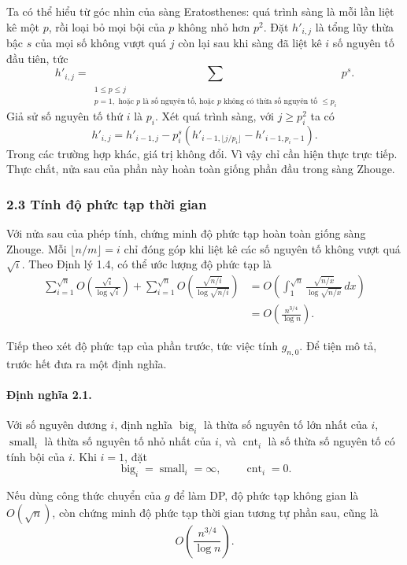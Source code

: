 \documentclass[11pt]{article}
\begin{document}
Ta có thể hiểu từ góc nhìn của sàng Eratosthenes: quá trình sàng là mỗi lần
liệt kê một \(p\), rồi loại bỏ mọi bội của \(p\) không nhỏ hơn \(p^2\). Đặt
\(h'_{i,j}\) là tổng lũy thừa bậc \(s\) của mọi số không vượt quá \(j\) còn lại
sau khi sàng đã liệt kê \(i\) số nguyên tố đầu tiên, tức
\[
  h'_{i,j}=
  \sum_{\substack{1\le p\le j\\
  p=1,\text{ hoặc }p\text{ là số nguyên tố, hoặc }p
  \text{ không có thừa số nguyên tố }\le p_i}}p^s .
\]
Giả sử số nguyên tố thứ \(i\) là \(p_i\). Xét quá trình sàng, với
\(j\ge p_i^2\) ta có
\[
  h'_{i,j}=h'_{i-1,j}
  -p_i^s\left(h'_{i-1,\lfloor j/p_i\rfloor}-h'_{i-1,p_i-1}\right).
\]
Trong các trường hợp khác, giá trị không đổi. Vì vậy chỉ cần hiện thực trực
tiếp. Thực chất, nửa sau của phần này hoàn toàn giống phần đầu trong sàng
Zhouge.

\subsubsection*{2.3 Tính độ phức tạp thời gian}

Với nửa sau của phép tính, chứng minh độ phức tạp hoàn toàn giống sàng Zhouge.
Mỗi \(\lfloor n/m\rfloor=i\) chỉ đóng góp khi liệt kê các số nguyên tố không
vượt quá \(\sqrt i\). Theo Định lý 1.4, có thể ước lượng độ phức tạp là
\[
\begin{aligned}
  \sum_{i=1}^{\sqrt n} O\left(\frac{\sqrt i}{\log\sqrt i}\right)
  +\sum_{i=1}^{\sqrt n}O\left(\frac{\sqrt{n/i}}{\log\sqrt{n/i}}\right)
  &=O\left(\int_1^{\sqrt n}\frac{\sqrt{n/x}}{\log\sqrt{n/x}}\,dx\right)\\
  &=O\left(\frac{n^{3/4}}{\log n}\right).
\end{aligned}
\]

Tiếp theo xét độ phức tạp của phần trước, tức việc tính \(g_{n,0}\). Để tiện
mô tả, trước hết đưa ra một định nghĩa.

\paragraph{Định nghĩa 2.1.}
Với số nguyên dương \(i\), định nghĩa \(\operatorname{big}_i\) là thừa số
nguyên tố lớn nhất của \(i\), \(\operatorname{small}_i\) là thừa số nguyên tố
nhỏ nhất của \(i\), và \(\operatorname{cnt}_i\) là số thừa số nguyên tố có tính
bội của \(i\). Khi \(i=1\), đặt
\[
  \operatorname{big}_i=\operatorname{small}_i=\infty,\qquad
  \operatorname{cnt}_i=0.
\]

Nếu dùng công thức chuyển của \(g\) để làm DP, độ phức tạp không gian là
\(O(\sqrt n)\), còn chứng minh độ phức tạp thời gian tương tự phần sau, cũng là
\[
  O\left(\frac{n^{3/4}}{\log n}\right).
\]
\end{document}
